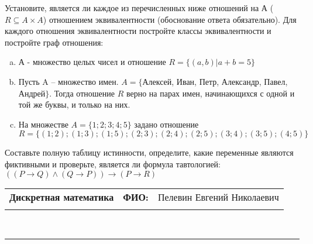 \documentclass[10pt]{exam}
\newcommand{\class}{Дискретная математика}
\newcommand{\examdate}{}
\begin{document}
\begin{questions}
\question
Установите, является ли каждое из перечисленных ниже отношений на А ($R \subseteq A \times A$) отношением эквивалентности (обоснование ответа обязательно). Для каждого отношения эквивалентности постройте классы 
эквивалентности и постройте граф отношения:
\begin{enumerate} [a)]\setcounter{enumi}{0}
\item А - множество целых чисел и отношение $R = \{(a,b)|a + b = 5\}$
\item Пусть A – множество имен. $A = \{ $Алексей, Иван, Петр, Александр, Павел, Андрей$ \}$. Тогда отношение $R $ верно на парах имен, начинающихся с одной и той же буквы, и только на них.
\item На множестве $A = \{1; 2; 3; 4; 5\}$ задано отношение $R = \{(1; 2); (1; 3); (1; 5); (2; 3); (2; 4); (2; 5); (3; 4); (3; 5); (4; 5)\}$
\end{enumerate}\question Составьте полную таблицу истинности, определите, какие переменные являются фиктивными и проверьте, является ли формула тавтологией:
$(( P \rightarrow Q) \land (Q \rightarrow P)) \rightarrow (P \rightarrow R)$

\end{questions}
\newpage
\begin{flushright}
\begin{tabular}{p{2.8in} r l}
\textbf{\class} & \textbf{ФИО:} &Пелевин Евгений Николаевич
\\

\textbf{\examdate} &&\\
\end{tabular}\\
\end{flushright}
\rule[1ex]{\textwidth}{.1pt}
\end{document}
